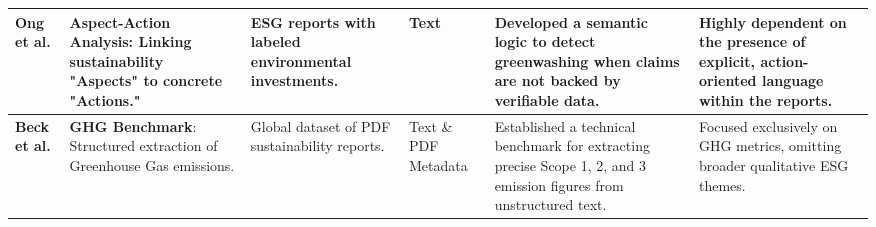 \documentclass[english, online, cse, master]{dithesis}
\begin{document}
\begin{landscape}
\begin{table}[p]
\begin{tabularx}{\linewidth}{|p{1.8cm}|p{3.5cm}|p{3.5cm}|p{1.8cm}|X|X|}
\textbf{Ong et al.}  \parencite{keane_ong_369a0b63} & \textbf{Aspect-Action Analysis}: Linking sustainability "Aspects" to concrete "Actions." & ESG reports with labeled environmental investments. & Text & Developed a semantic logic to detect greenwashing when claims are not backed by verifiable data. & Highly dependent on the presence of explicit, action-oriented language within the reports. \\ \hline
\textbf{Beck et al.}  \parencite{jacob_beck_9548a833} & \textbf{GHG Benchmark}: Structured extraction of Greenhouse Gas emissions. & Global dataset of PDF sustainability reports. & Text \& PDF Metadata & Established a technical benchmark for extracting precise Scope 1, 2, and 3 emission figures from unstructured text. & Focused exclusively on GHG metrics, omitting broader qualitative ESG themes. \\ \hline
\end{tabularx}
\end{table}
\end{landscape}
\end{document}
